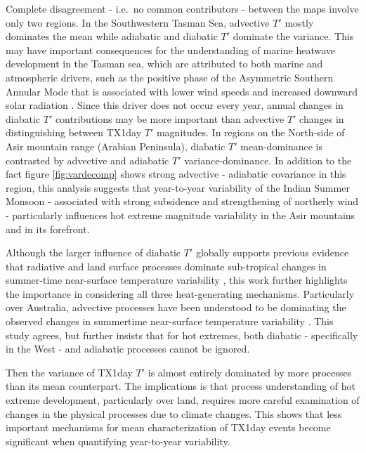 \documentclass[11pt,a4paper,twoside,openright]{report}
\theoremstyle{definition}
\begin{document}
Complete disagreement - i.e.~no common contributors - between the maps involve only two regions. In the Southwestern Tasman Sea, advective \(T'\) mostly dominates the mean while adiabatic and diabatic \(T'\) dominate the variance. This may have important consequences for the understanding of marine heatwave development in the Tasman sea, which are attributed to both marine and atmospheric drivers, such as the positive phase of the Asymmetric Southern Annular Mode that is associated with lower wind speeds and increased downward solar radiation \citep{gregory_atmospheric_2023}. Since this driver does not occur every year, annual changes in diabatic \(T'\) contributions may be more important than advective \(T'\) changes in distinguishing between TX1day \(T'\) magnitudes. In regions on the North-side of Asir mountain range (Arabian Peninsula), diabatic \(T'\) mean-dominance is contrasted by advective and adiabatic \(T'\) variance-dominance. In addition to the fact figure \ref{fig:vardecomp} shows strong advective - adiabatic covariance in this region, this analysis suggests that year-to-year variability of the Indian Summer Monsoon - associated with strong subsidence and strengthening of northerly wind \citep{attada_role_2019} - particularly influences hot extreme magnitude variability in the Asir mountains and in its forefront.

Although the larger influence of diabatic \(T'\) globally supports previous evidence that radiative and land surface processes dominate sub-tropical changes in summer-time near-surface temperature variability \citep{holmes_robust_2015}, this work further highlights the importance in considering all three heat-generating mechanisms. Particularly over Australia, advective processes have been understood to be dominating the observed changes in summertime near-surface temperature variability \citep{watterson_changes_2008,holmes_robust_2015}. This study agrees, but further insists that for hot extremes, both diabatic - specifically in the West - and adiabatic processes cannot be ignored.

Then the variance of TX1day \(T'\) is almost entirely dominated by more processes than its mean counterpart. The implications is that process understanding of hot extreme development, particularly over land, requires more careful examination of changes in the physical processes due to climate changes. This shows that less important mechanisms for mean characterization of TX1day events become significant when quantifying year-to-year variability.
\end{document}
